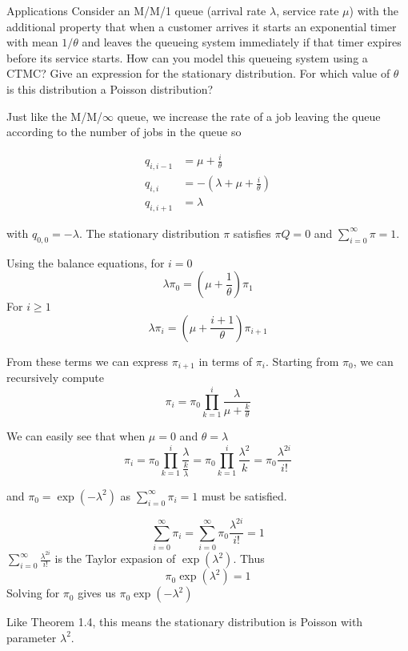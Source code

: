 \begin{problem}{Applications}
Consider an M/M/1 queue (arrival rate \( \lambda \), service rate \( \mu \)) with the additional property that when a customer arrives it starts an exponential timer with mean \( 1/\theta \) and leaves the queueing system immediately if that timer expires before its service starts. How can you model this queueing system using a CTMC? Give an expression for the stationary distribution. For which value of \( \theta \) is this distribution a Poisson distribution?
\end{problem}

\begin{solution}
    Just like the M/M/$\infty$ queue, we increase the rate of a job leaving the queue according to the number of jobs in the queue so

    \begin{align*}
        q_{i,i-1}& = \mu + \frac{i}{\theta}\\
        q_{i,i}  & = -(\lambda + \mu + \frac{i}{\theta})\\
        q_{i,i+1}& = \lambda
    \end{align*}

    with $q_{0,0} = -\lambda$. The stationary distribution $\pi$ satisfies $\pi Q=0$ and $\sum_{i=0}^\infty\pi=1$.

    Using the balance equations, for $i=0$
    \[
        \lambda\pi_0 = \left(\mu+\frac{1}{\theta}\right)\pi_1
    \]
    For $i\geq 1$
    \[
        \lambda\pi_i = \left(\mu+\frac{i+1}{\theta}\right)\pi_{i+1}
    \]

    From these terms we can express $\pi_{i+1}$ in terms of $\pi_i$. Starting from $\pi_0$, we can recursively compute
    \[
        \pi_i = \pi_0\prod_{k=1}^i\frac{\lambda}{\mu+\frac{k}{\theta}}
    \]

    We can easily see that when $\mu=0$ and $\theta=\lambda$
    \[
        \pi_i = \pi_0\prod_{k=1}^i\frac{\lambda}{\frac{k}{\lambda}}=\pi_0\prod_{k=1}^i\frac{\lambda^2}{k} = \pi_0\frac{\lambda^{2i}}{i!}
    \]

    and $\pi_0=\exp(-\lambda^2)$ as $\sum_{i=0}^\infty\pi_i=1$ must be satisfied.

    \[
        \sum_{i=0}^\infty\pi_i=\sum_{i=0}^\infty\pi_0\frac{\lambda^{2i}}{i!}=1
    \]
    $\sum_{i=0}^\infty\frac{\lambda^{2i}}{i!}$ is the Taylor expasion of $\exp(\lambda^2)$. Thus
    \[
        \pi_0\exp(\lambda^2) = 1
    \]
    Solving for $\pi_0$ gives us $\pi_0\exp(-\lambda^2)$

Like Theorem 1.4, this means the stationary distribution is Poisson with parameter $\lambda^2$.
\end{solution}
